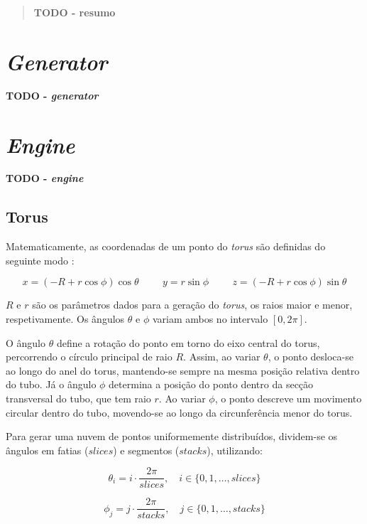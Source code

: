 \documentclass[12pt, a4paper]{article}
\begin{document}
\pagebreak

\begin{abstract}
    \textbf{\color{red} TODO - resumo}
\end{abstract}

\section{\emph{Generator}}

\textbf{\color{red} TODO - \emph{generator}}

\section{\emph{Engine}}

\textbf{\color{red} TODO - \emph{engine}}

\subsection{Torus}

Matematicamente, as coordenadas de um ponto do \emph{torus} são definidas do seguinte modo
\cite{torus}:

$$
x = (-R + r \cos \phi) \cos \theta
\hspace{1cm}
y = r \sin \phi
\hspace{1cm}
z = (-R + r \cos \phi) \sin \theta
$$

$R$ e $r$ são os parâmetros dados para a geração do \emph{torus}, os raios maior e menor,
respetivamente. Os ângulos $\theta$ e $\phi$ variam ambos no intervalo $[0, 2\pi]$.

O ângulo $\theta$ define a rotação do ponto em torno do eixo central do torus, percorrendo o
círculo principal de raio $R$. Assim, ao variar $\theta$, o ponto desloca-se ao longo do anel do
torus, mantendo-se sempre na mesma posição relativa dentro do tubo. Já o ângulo $\phi$ determina a
posição do ponto dentro da secção transversal do tubo, que tem raio $r$. Ao variar $\phi$, o ponto
descreve um movimento circular dentro do tubo, movendo-se ao longo da circunferência menor do torus.

Para gerar uma nuvem de pontos uniformemente distribuídos, dividem-se os ângulos em fatias
($slices$) e segmentos ($stacks$), utilizando:

$$
\theta_i = i \cdot \frac{2\pi}{slices}, \quad i \in \{0, 1, \ldots, slices\}
$$

$$
\phi_j = j \cdot \frac{2\pi}{stacks}, \quad j \in \{0, 1, \ldots, stacks\}
$$
\end{document}
